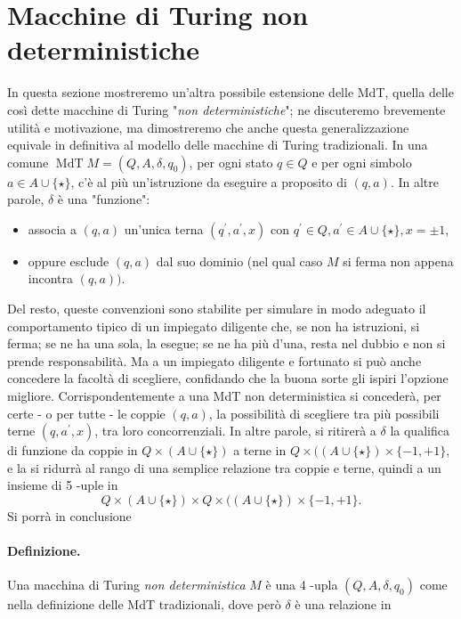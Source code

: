 
\section{Macchine di Turing non deterministiche}

In questa sezione mostreremo un'altra possibile estensione
delle MdT, quella delle così dette macchine di Turing "\textit{non deterministiche}"; ne
discuteremo brevemente utilità e motivazione, ma dimostreremo che anche questa
generalizzazione equivale in definitiva al modello delle macchine di Turing
tradizionali. In una comune $\operatorname{MdT} M=\left(Q, A, \delta, q_0\right)$,
per ogni stato $q \in Q$ e per ogni simbolo $a \in A \cup\{\star\}$, c'è al più
un'istruzione da eseguire a proposito di $(q, a)$. In altre parole, $\delta$ è una
"funzione":
\begin{itemize}
    \item associa a $(q, a)$ un'unica terna $\left(q^{\prime}, a^{\prime},
              x\right)$ con $q^{\prime} \in Q, a^{\prime} \in A \cup\{\star\}, x=\pm 1$,
    \item oppure esclude $(q, a)$ dal suo dominio (nel qual caso $M$ si ferma non appena incontra $(q,
              a))$.
\end{itemize}

Del resto, queste convenzioni sono stabilite per simulare in modo adeguato il
comportamento tipico di un impiegato diligente che, se non ha istruzioni, si ferma;
se ne ha una sola, la esegue; se ne ha più d'una, resta nel dubbio e non si prende
responsabilità. Ma a un impiegato diligente e fortunato si può anche concedere la
facoltà di scegliere, confidando che la buona sorte gli ispiri l'opzione migliore.
Corrispondentemente a una MdT non deterministica si concederà, per certe - o per
tutte - le coppie $(q, a)$, la possibilità di scegliere tra più possibili terne
$\left(q, a^{\prime}, x\right)$, tra loro concorrenziali. In altre parole, si
ritirerà a $\delta$ la qualifica di funzione da coppie in $Q \times(A \cup\{\star\})$
a terne in $Q \times((A \cup\{\star\}) \times\{-1,+1\}$, e la si ridurrà al rango di
una semplice relazione tra coppie e terne, quindi a un insieme di 5 -uple in
$$
    Q \times(A \cup\{\star\}) \times Q \times((A \cup\{\star\}) \times\{-1,+1\} .
$$
Si porrà in conclusione

\paragraph{Definizione.} Una macchina di Turing \textit{non deterministica} $M$ è una 4 -upla
$(Q, A, \delta, q_0)$ come nella definizione delle MdT tradizionali,
dove però $\delta$ è una relazione in

